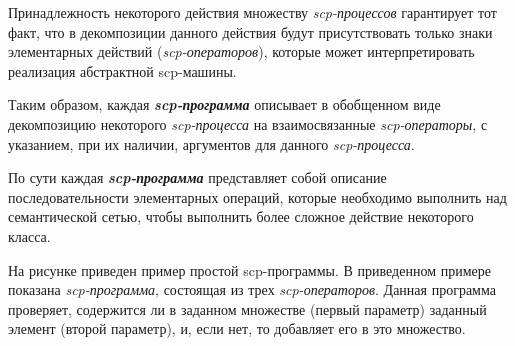 Принадлежность некоторого действия множеству \textit{scp-процессов} гарантирует тот факт, что в декомпозиции данного действия будут присутствовать только знаки элементарных действий (\textit{scp-операторов}), которые может интерпретировать реализация абстрактной scp-машины.

Таким образом, каждая \textbf{\textit{scp-программа}} описывает в обобщенном виде декомпозицию некоторого \textit{\mbox{scp-процесса}} на взаимосвязанные \textit{scp-операторы}, с указанием, при их наличии, аргументов для данного \textit{scp-процесса}.

По сути каждая \textbf{\textit{scp-программа}} представляет собой описание последовательности элементарных операций, которые необходимо выполнить над семантической сетью, чтобы выполнить более сложное действие некоторого класса.

На рисунке \textit{} приведен пример простой scp-программы. В приведенном примере показана \textit{scp-программа}, состоящая из трех \textit{scp-операторов}. Данная программа проверяет, содержится ли в заданном множестве (первый параметр) заданный элемент (второй параметр), и, если нет, то добавляет его в это множество.
	

